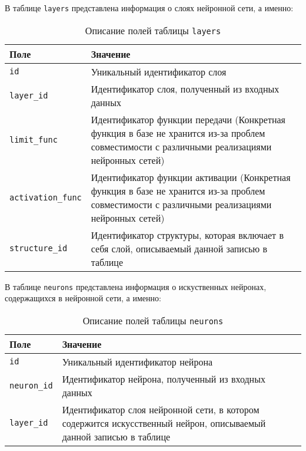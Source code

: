 В таблице \texttt{layers} представлена информация о слоях нейронной сети, а именно:

\begin{table}[!ht]
    \caption{Описание полей таблицы \texttt{layers}}
    \label{tbl:layers}
    \begin{center}
        \begin{tabular}{|p{}|p{}|}
            \hline
            \textbf{Поле} & \textbf{Значение} \\\hline
            \texttt{id} & Уникальный идентификатор слоя \\\hline
            \texttt{layer\_id} & Идентификатор слоя, полученный из входных данных \\\hline
            \texttt{limit\_func} & Идентификатор функции передачи (Конкретная функция в базе не хранится из-за проблем совместимости с различными реализациями нейронных сетей) \\\hline
            \texttt{activation\_func} & Идентификатор функции активации (Конкретная функция в базе не хранится из-за проблем совместимости с различными реализациями нейронных сетей) \\\hline
            \texttt{structure\_id} & Идентификатор структуры, которая включает в себя слой, описываемый данной записью в таблице \\\hline
        \end{tabular}
    \end{center}
\end{table}

В таблице \texttt{neurons} представлена информация о искуственных нейронах, содержащихся в нейронной сети, а именно:

\newpage

\begin{table}[!ht]
    \caption{Описание полей таблицы \texttt{neurons}}
    \label{tbl:neurons}
    \begin{center}
        \begin{tabular}{|p{}|p{}|}
            \hline
            \textbf{Поле} & \textbf{Значение} \\\hline
            \texttt{id} & Уникальный идентификатор нейрона \\\hline
             \texttt{neuron\_id} & Идентификатор нейрона, полученный из входных данных \\\hline
            \texttt{layer\_id} & Идентификатор слоя нейронной сети, в котором содержится искусственный нейрон, описываемый данной записью в таблице \\\hline
        \end{tabular}
    \end{center}
\end{table}


